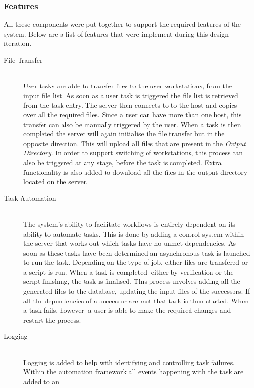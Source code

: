 \documentclass[12pt,a4paper]{report}
\begin{document}
\subsubsection{Features}
All these components were put together to support the required features of the system. Below
are a list of features that were implement during this design iteration.
\begin{description}
    \item[File Transfer] \hfill \\
        User tasks are able to transfer files to the user workstations, from the input
        file list. As soon as a user task is triggered the file list is retrieved
        from the task entry. The server then connects to to the host and copies over all
        the required files. Since a user can have more than one host, this transfer can also
        be manually triggered by the user. When a task is then completed the server will
        again initialise the file transfer but in the opposite direction. This
	will upload all files that are present in the \emph{Output Directory}. In order
	to support switching of workstations,
        this process can also be triggered at any stage, before the task is completed.
        Extra functionality is also added to download all the files in the output directory
        located on the server.
    \item[Task Automation] \hfill \\
        The system's ability to facilitate workflows is entirely dependent on its ability
        to automate tasks. This is done by adding a control system within the server
        that works out which tasks have no unmet dependencies. As soon as these tasks
        have been determined an asynchronous task is launched to run the task. Depending on
        the type of job, either files are transfered or a script is run. When a task is
        completed, either by verification or the script finishing, the task is finalised.
        This process involves adding all the generated files to the database, updating the
        input files of the successors. If all the dependencies of a successor
	are met that task is then started. When a task fails, however, a user is able to 
	make the required changes and restart the process.
    \item[Logging] \hfill \\
        Logging is added to help with identifying and controlling task failures. Within
        the automation framework all events happening with the task are added to an

\end{description}
\end{document}

